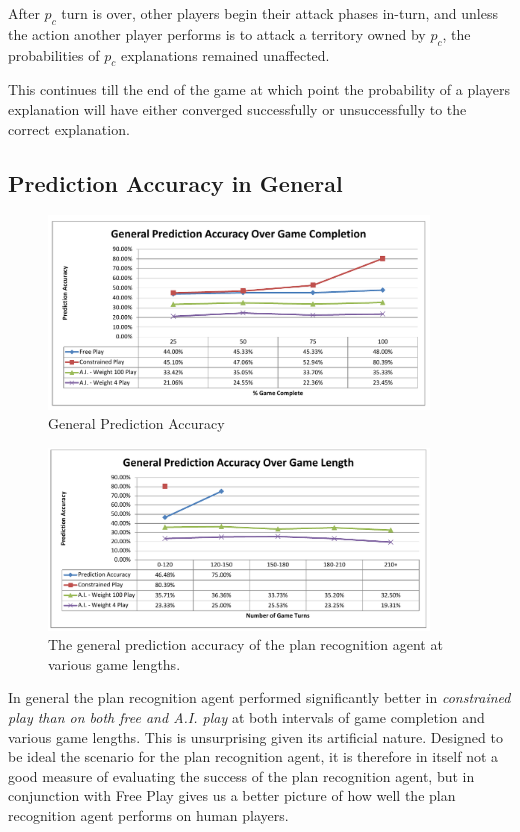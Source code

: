 \documentclass[parskip]{cs4rep}
\begin{document}
After $p_c$ turn is over, other players begin their attack phases in-turn, and unless the action another player performs is to attack a territory owned by $p_c$, the probabilities of $p_c$ explanations remained unaffected. 

This continues till the end of the game at which point the probability of a players explanation will have either converged successfully or unsuccessfully to the correct explanation. 

\subsection{Prediction Accuracy in General}

\begin{figure}[h]
\centerline{
\includegraphics[width=0.9\textwidth]{images/general-game-complete.pdf}
}
\caption{General Prediction Accuracy}
\label{fig:dom-debug-gui}
\end{figure} 

\begin{figure}[h]
\centerline{
\includegraphics[width=0.9\textwidth]{images/general-game-length.pdf}
}
\caption{The general prediction accuracy of the plan recognition agent at various game lengths. }
\label{fig:dom-debug-gui}
\end{figure} 

In general the plan recognition agent performed significantly better in \textit{constrained play than on both free and A.I. play} at both intervals of game completion and various game lengths. This is unsurprising given its artificial nature. Designed to be ideal the scenario for the plan recognition agent, it is therefore in itself not a good measure of evaluating the success of the plan recognition agent, but in conjunction with Free Play gives us a better picture of how well the plan recognition agent performs on human players.
\end{document}
